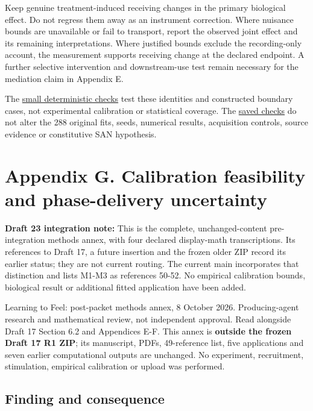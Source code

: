 \documentclass[
  american,
  11pt,
  letterpaper,
]{article}
\begin{document}
Keep genuine treatment-induced receiving changes in the primary biological effect. Do not regress them away as an instrument correction. Where nuisance bounds are unavailable or fail to transport, report the observed joint effect and its remaining interpretations. Where justified bounds exclude the recording-only account, the measurement supports receiving change at the declared endpoint. A further selective intervention and downstream-use test remain necessary for the mediation claim in Appendix E.

The \href{https://github.com/v5ma/v5ma.github.io/blob/master/papers/companions/learning-to-feel-v1.0/ARTIFACT-AVAILABILITY.md#artifact-23}{small deterministic checks} test these identities and constructed boundary cases, not experimental calibration or statistical coverage. The \href{https://github.com/v5ma/v5ma.github.io/blob/master/papers/companions/learning-to-feel-v1.0/ARTIFACT-AVAILABILITY.md#artifact-24}{saved checks} do not alter the 288 original fits, seeds, numerical results, acquisition controls, source evidence or constitutive SAN hypothesis.

\clearpage
\endgroup
\hypertarget{appendix-g}{}

\section{Appendix G. Calibration feasibility and phase-delivery uncertainty}\label{appendix-g.-calibration-feasibility-and-phase-delivery-uncertainty}

\textbf{Draft 23 integration note:} This is the complete, unchanged-content pre-integration methods annex, with four declared display-math transcriptions. Its references to Draft 17, a future insertion and the frozen older ZIP record its earlier status; they are not current routing. The current main incorporates that distinction and lists M1-M3 as references 50-52. No empirical calibration bounds, biological result or additional fitted application have been added.

Learning to Feel: post-packet methods annex, 8 October 2026. Producing-agent research and mathematical review, not independent approval. Read alongside Draft 17 Section 6.2 and Appendices E-F. This annex is \textbf{outside the frozen Draft 17 R1 ZIP}; its manuscript, PDFs, 49-reference list, five applications and seven earlier computational outputs are unchanged. No experiment, recruitment, stimulation, empirical calibration or upload was performed.

\subsection{Finding and consequence}\label{finding-and-consequence}
\end{document}

